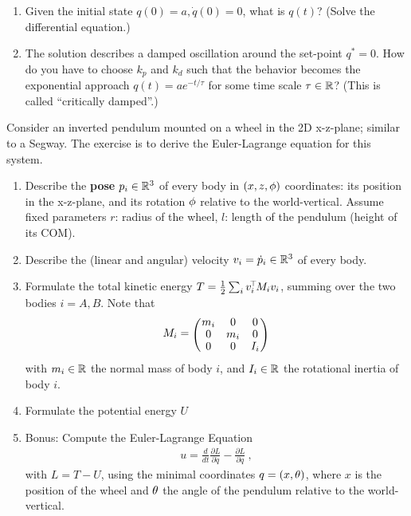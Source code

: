 \begin{enumerate}
\item Given the initial state $q(0) = a, \dot q(0) = 0$, what is $q(t)$? (Solve the differential equation.)


\item The solution describes a damped oscillation around the set-point $q^*=0$. How do you have to choose $k_p$ and $k_d$ such that the behavior becomes the exponential approach $q(t) = a e^{-t/\tau}$ for some time scale $\tau\in{\mathbb{R}}$? (This is called ``critically damped''.)


\end{enumerate}




Consider an inverted pendulum mounted on a wheel in the 2D x-z-plane;
similar to a Segway. The exercise is to derive the Euler-Lagrange
equation for this system.

\begin{enumerate}
\item Describe the \textbf{pose} $p_i\in{\mathbb{R}}^3$ of every body in  $(x,z,\phi)$ coordinates: its position in the x-z-plane, and its
rotation $\phi$ relative to the world-vertical. Assume fixed parameters $r$: radius of the wheel, $l$: length of the pendulum (height of its COM).


\item Describe the (linear and angular) velocity $v_i = \dot p_i \in{\mathbb{R}}^3$ of every body.

\item Formulate the total kinetic energy $T = \frac{1}{2} \sum_i v_i^{\!\top\!} M_i v_i$, summing over the two bodies $i=A, B$. Note that
\begin{align}
M_i = \mat{ccc}{m_i & 0 & 0 \\ 0 & m_i & 0 \\ 0 & 0 & I_i}
\end{align}
with $m_i\in{\mathbb{R}}$ the normal mass of body $i$, and $I_i\in{\mathbb{R}}$ the rotational inertia of body $i$.


\item Formulate the potential energy $U$

\item Bonus: Compute the Euler-Lagrange Equation
\begin{align}
u = \frac{d}{dt} \frac{\partial L}{\partial \dot{q}} -  \frac{\partial L}{\partial q} ~,
\end{align}
with $L = T-U$, using the minimal coordinates $q=(x,\theta)$, where $x$ is the position of the wheel and $\theta$ the angle of the
pendulum relative to the world-vertical.

\end{enumerate}

